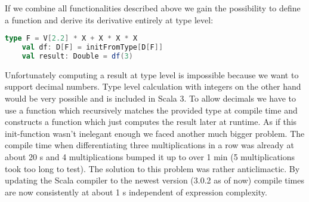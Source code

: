 If we combine all functionalities described above we gain the possibility to define a function and derive its derivative entirely at type level:
\begin{lstlisting}[language=scala]
    type F = V[2.2] * X + X * X * X
    val df: D[F] = initFromType[D[F]]
    val result: Double = df(3)
\end{lstlisting}
Unfortunately computing a result at type level is impossible because we want to support decimal numbers. Type level calculation with integers on the other hand would be very possible and is included in Scala 3. To allow decimals we have to use a function  which recursively matches the provided type at compile time and constructs a function which just computes the result later at runtime. As if this init-function wasn't inelegant enough we faced another much bigger problem. The compile time when differentiating three multiplications in a row was already at about 20 s and 4 multiplications bumped it up to over 1 min (5 multiplications took too long to test). The solution to this problem was rather anticlimactic. By updating the Scala compiler to the newest version (3.0.2 as of now) compile times are now consistently at about 1 s independent of expression complexity.  
